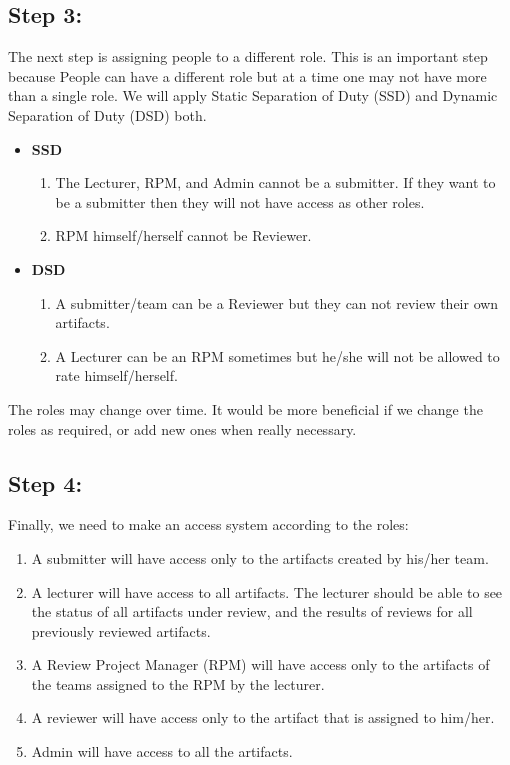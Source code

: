 \subsection*{Step 3:}

The next step is assigning people to a different role. This is an important step because People can have a different role but at a time one may not have more than a single role. We will apply Static Separation of Duty (SSD) and Dynamic Separation of Duty (DSD)  both. 

\begin{itemize}
\itemsep-1em 
    \item \textbf{SSD}
    \begin{enumerate}
     \itemsep-1em 
    \item The Lecturer, RPM, and Admin cannot be a submitter. If they want to be a submitter then they will not have access as other roles.
    \item RPM himself/herself cannot be Reviewer.
    
\end{enumerate}

    \item \textbf{DSD}
    \begin{enumerate}
    
    
\itemsep-1em 
    \item A submitter/team can be a Reviewer but they can not review their own artifacts.
    \item A Lecturer can be an RPM sometimes but he/she will not be allowed to rate himself/herself.
    
\end{enumerate}
\end{itemize}


The roles may change over time. It would be more beneficial if we change the roles as required, or add new ones when really necessary. 


\newpage

\subsection*{Step 4:}
Finally, we need to make an access system according to the roles:
\begin{enumerate}
    
    
\itemsep-1em 
    \item  A submitter will have access only to the artifacts created by his/her team.
\item  A lecturer will have access to all artifacts. The lecturer should be able to see the status of all artifacts under review, and the results of reviews for all previously reviewed artifacts. 
\item  A Review Project Manager (RPM) will have access only to the artifacts of the teams assigned to the RPM by the lecturer. 
\item  A reviewer will have access only to the artifact that is assigned to him/her.
\item  Admin will have access to all the artifacts.

    
\end{enumerate}